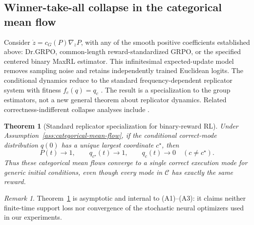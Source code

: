 \documentclass{article}
\newcommand{\1}{\mathbf 1}
\newtheorem{theorem}[lemma]{Theorem}
\theoremstyle{remark}
\newtheorem{remark}[lemma]{Remark}
\theoremstyle{definition}
\theoremstyle{plain}
\begin{document}
\subsection{Winner-take-all collapse in the categorical mean flow}
\label{app:theory-collapse}

Consider $\dot z=c_G(P)\nabla_zP$, with any of the smooth positive
coefficients established above: Dr.GRPO, common-length reward-standardized
GRPO, or the specified centered binary MaxRL estimator. This infinitesimal
expected-update model removes
sampling noise and retains independently trained Euclidean logits. The
conditional dynamics reduce to the standard frequency-dependent replicator
system with fitness $f_c(q)=q_c$ \citep{hofbauer1998evolutionary}. The result is
a specialization to the group estimators, not a new general theorem about
replicator dynamics. Related correctness-indifferent collapse analyses include
\citet{sinha2026expected,lochab2026ucpo}.

\begin{theorem}[Standard replicator specialization for binary-reward RL]
\label{thm:grpo-collapse}
Under Assumption~\ref{ass:categorical-mean-flow}, if the conditional correct-mode
distribution $q(0)$ has a unique largest coordinate $c^\star$, then
\[
  P(t)\longrightarrow1,
  \qquad
  q_{c^\star}(t)\longrightarrow1,
  \qquad
  q_c(t)\longrightarrow0\quad(c\ne c^\star).
\]
Thus these categorical mean flows converge to a single correct execution
mode for generic initial conditions, even though every mode in $\mathcal C$
has exactly the same reward.
\end{theorem}

\begin{remark}
Theorem~\ref{thm:grpo-collapse} is asymptotic and internal to (A1)--(A3): it
claims neither finite-time support loss nor convergence of the stochastic
neural optimizers used in our experiments.
\end{remark}
\end{document}

